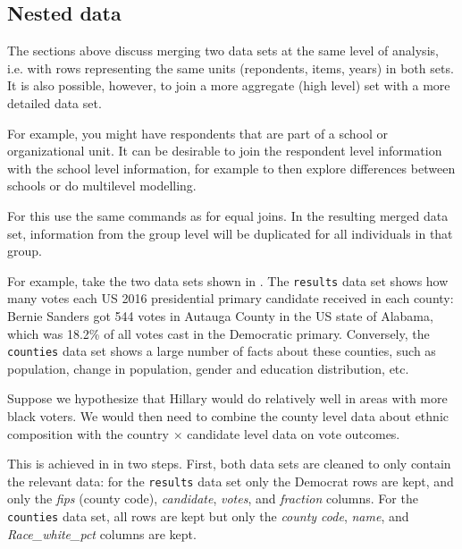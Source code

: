 \subsection{Nested data}

The sections above discuss merging two data sets at the same level of analysis,
i.e. with rows representing the same units (repondents, items, years) in both sets.
It is also possible, however, to join a more aggregate (high level) set with a more detailed data set.

For example, you might have respondents that are part of a school or organizational unit.
It can be desirable to join the respondent level information with the school level information,
for example to then explore differences between schools or do multilevel modelling.

For this use the same commands as for equal joins.
In the resulting merged data set, information from the group level will be duplicated for all individuals in that group.

For example, take the two data sets shown in .
The \texttt{results} data set shows how many votes each US 2016 presidential primary candidate received in each county:
Bernie Sanders got 544 votes in Autauga County in the US state of Alabama, which was 18.2\% of all votes cast in the
Democratic primary.
Conversely, the \texttt{counties} data set shows a large number of facts about these counties,
such as population, change in population, gender and education distribution, etc. 


Suppose we hypothesize that Hillary would do relatively well in areas with more black voters.
We would then need to combine the county level data about ethnic composition with the country $\times$ candidate
level data on vote outcomes.

This is achieved in  in two steps.
First, both data sets are cleaned to only contain the relevant data:
for the \texttt{results} data set only the Democrat rows are kept, and only the \emph{fips} (county code), \emph{candidate}, \emph{votes}, and \emph{fraction} columns.
For the \texttt{counties} data set, all rows are kept but only the \emph{county code}, \emph{name}, and \emph{Race\_white\_pct} columns are kept.


